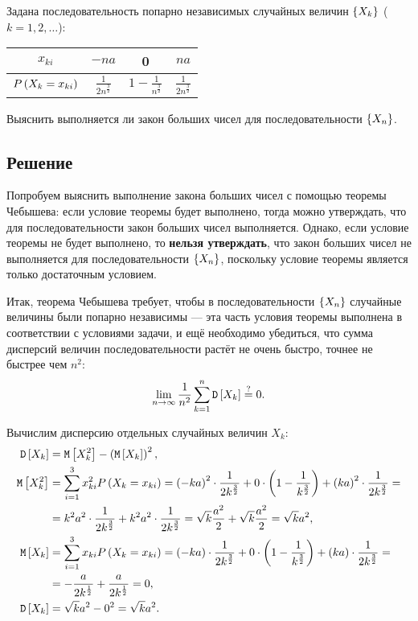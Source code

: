 Задана последовательность попарно независимых случайных величин $\left \{ X_k \right \}$ ($k=1,2,\dots$):

\begin{tabular}{|c|c|c|c|}
    \hline
    $x_{ki}$                     & $-n a$                        & 0                             & $na$                       \\
    \hline
    $P \left ( X_k = x_{ki} \right )$ & $\frac{1}{2 n^{\frac{3}{2}}}$ & $1 - \frac{1}{n^\frac{3}{2}}$ & $\frac{1}{2n^\frac{3}{2}}$ \\
    \hline
\end{tabular}

Выяснить выполняется ли закон больших чисел для последовательности $\left \{ X_n \right \}$.

\subsection*{Решение}
Попробуем выяснить выполнение закона больших чисел с помощью теоремы Чебышева: если условие теоремы будет выполнено,
тогда можно утверждать, что для последовательности закон больших чисел выполняется. Однако, если условие теоремы не будет выполнено, то
\textbf{нельзя утверждать}, что закон больших чисел не выполняется для последовательности $\left \{ X_n \right \}$, поскольку условие теоремы является только достаточным условием.

Итак, теорема Чебышева требует, чтобы в последовательности $\left \{ X_n \right \}$ случайные величины были попарно независимы --- эта часть условия
теоремы выполнена в соответствии с условиями задачи, и ещё необходимо убедиться, что сумма дисперсий величин последовательности растёт не очень быстро,
точнее не быстрее чем $n^2$:
\begin{equation}
    \lim_{n \rightarrow \infty} \frac{1}{n^2} \sum_{k=1}^n \mathtt{D} \left [ X_k \right ] \stackrel{?}{=} 0 .
\end{equation}

Вычислим дисперсию отдельных случайных величин $X_k$:
\begin{align}
    \mathtt{D} \left [ X_k \right ] & = \mathtt{M} \left [ X_k^2 \right ] - \left ( \mathtt{M} \left [ X_k \right ] \right )^2 , \\
    \mathtt{M} \left [ X_k^2 \right ]
    & = \sum_{i=1}^3 x_{ki}^2 P \left ( X_k = x_{ki} \right )
    = \left ( - k a \right )^2 \cdot \frac{1}{2 k^\frac{3}{2}} + 0 \cdot \left ( 1 - \frac{1}{k^\frac{3}{2}} \right ) + \left ( k a \right )^2 \cdot \frac{1}{2 k^\frac{3}{2}} = \notag \\
    & = k^2 a^2 \cdot \frac{1}{2 k^\frac{3}{2}} + k^2 a^2 \cdot \frac{1}{2 k^\frac{3}{2}}
    = \sqrt{k} \frac{a^2}{2} + \sqrt{k} \frac{a^2}{2} = \sqrt{k} a^2 , \\
    \mathtt{M} \left [ X_k \right ]
    & = \sum_{i=1}^3 x_{ki} P \left ( X_k = x_{ki} \right )
    = \left ( - k a \right ) \cdot \frac{1}{2 k^\frac{3}{2}} + 0 \cdot \left ( 1 - \frac{1}{k^\frac{3}{2}} \right ) + \left ( k a \right ) \cdot \frac{1}{2 k^\frac{3}{2}} = \notag \\
    & = - \frac{a}{2 k^\frac{1}{2}} + \frac{a}{2 k^\frac{1}{2}} = 0,\\
    \mathtt{D} \left [ X_k \right ] & = \sqrt{k} a^2 - 0^2 = \sqrt{k} a^2 .
\end{align}

